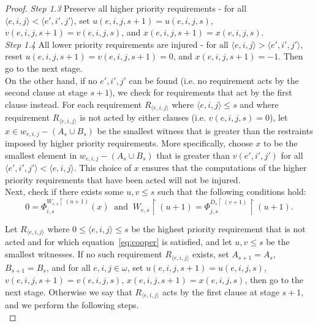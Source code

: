 \documentclass{article}
\begin{document}
\begin{proof}
    \textit{Step 1.3} Preserve all higher priority requirements - for all
    $\langle e,i,j\rangle <\langle e',i',j'\rangle$, set
    $u(e,i,j,s+1)=u(e,i,j,s)$, $v(e,i,j,s+1)=v(e,i,j,s)$, and
    $x(e,i,j,s+1)=x(e,i,j,s)$. \\

    \textit{Step 1.4} All lower priority requirements are injured - for all
    $\langle e,i,j\rangle >\langle e',i',j'\rangle$, reset
    $u(e,i,j,s+1)=v(e,i,j,s+1)=0$, and $x(e,i,j,s+1)=-1$. Then go to
    the next stage. \\

    On the other hand, if no $e',i',j'$ can be found (i.e. no requirement
    acts by the second clause at stage $s+1$), we check for requirements
    that act by the first clause instead. For each requirement $R_{\langle
    e,i,j\rangle}$ where $\langle e,i,j\rangle \leq s$ and where
    requirement $R_{\langle e,i,j\rangle}$ is not acted by either clauses
    (i.e.  $v(e,i,j,s)=0$), let $x\in w_{e,i,j}-(A_s\cup B_s)$ be the
    smallest witness that is greater than the restraints imposed by higher
    priority requirements. More specifically, choose $x$ to be the smallest
    element in $w_{e,i,j}-(A_s\cup B_s)$ that is greater than $v(e',i',j')$
    for all $\langle e',i',j'\rangle <\langle e,i,j\rangle$. This choice of
    $x$ ensures that the computations of the higher priority requirements
    that have been acted will not be injured. \\

    Next, check if there exists some $u,v\leq s$ such that the following
    conditions hold:
    \begin{equation}
      0 =\Phi_{i,s}^{W_{e,s}\restriction (u+1)} (x)\;\; \text{and}\;\;
      W_{e,s}\restriction (u+1) =\Phi_{j,s}^{D_s\restriction (v+1)}
      \restriction (u+1).
      \label{eq:cooper}
    \end{equation}

    Let $R_{\langle e,i,j\rangle}$ where $0\leq \langle e,i,j\rangle \leq
    s$ be the highest priority requirement that is not acted and for
    which equation~\eqref{eq:cooper} is satisfied, and let $u,v\leq s$ be
    the smallest witnesses. If no such requirement
    $R_{\langle e,i,j\rangle}$ exists, set $A_{s+1}=A_s$, $B_{s+1}=B_s$,
    and for all $e,i,j\in\omega$, set $u(e,i,j,s+1)=u(e,i,j,s)$,
    $v(e,i,j,s+1)=v(e,i,j,s)$, $x(e,i,j,s+1)=x(e,i,j,s)$,
    then go to the next stage. Otherwise we say that $R_{\langle
    e,i,j\rangle}$ acts by the first clause at stage $s+1$, and we perform
    the following steps. \\


\end{proof}
\end{document}
